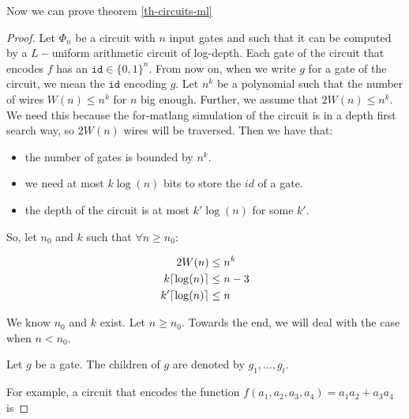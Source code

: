 Now we can prove theorem \ref{th-circuits-ml}

\begin{proof}

    Let $\Phi_n$ be a circuit with $n$ input gates and such that it can be computed by a $L-$uniform arithmetic circuit of log-depth. Each gate of the circuit that encodes $f$ has an $\texttt{id}\in\lbrace 0,1 \rbrace^n$. From now on, when we write $g$ for a gate of the circuit, we mean the $\texttt{id}$ encoding $g$.
    Let $n^k$ be a polynomial such that the number of wires $W(n)\leq n^k$ for $n$ big enough. Further, we assume that $2W(n)\leq n^k$. We need this because the for-matlang simulation of the circuit is in a depth first search way, so $2W(n)$ wires will be traversed.
    Then we have that:
    \begin{itemize}
        \item the number of gates is bounded by $n^k$.
        \item we need at most $k\log (n)$ bits to store the $id$ of a gate.
        \item the depth of the circuit is at most $k'\log (n)$ for some $k'$.
    \end{itemize}

    So, let $n_0$ and $k$ such that $\forall n\geq n_0:$

    \begin{align*}[right=\empheqrbrace (\star)]
        2W(n)&\leq n^k \\
        k \ceil{\log (n)} &\leq n-3 \\
        k' \ceil{\log(n)} &\leq n
    \end{align*}

    We know $n_0$ and $k$ exist. Let $n\geq n_0$. Towards the end, we will deal with the case when $n<n_0$.

    Let $g$ be a gate. The children of $g$ are denoted by $g_1,\ldots, g_l$.
    \begin{center}
    \end{center}

    For example, a circuit that encodes the function $f(a_1,a_2,a_3,a_4)=a_1a_2 +a_3a_4$ is 


\end{proof}
